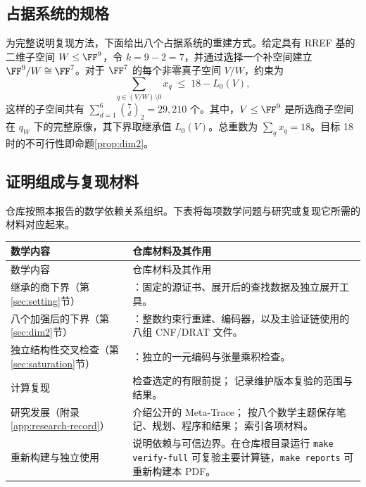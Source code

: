 \documentclass[11pt,a4paper]{article}
\begin{document}
\subsection{占据系统的规格}

为完整说明复现方法，下面给出八个占据系统的重建方式。给定具有 RREF 基的二维子空间 $W\le\FF^9$，令 $k=9-2=7$，并通过选择一个补空间建立 $\FF^9/W\cong\FF^7$。对于 $\FF^7$ 的每个非零真子空间 $V/W$，约束为
\[
  \sum_{q\in(V/W)\setminus0}x_q\;\le\;18-L_0(V),
\]
这样的子空间共有 $\sum_{d=1}^{6}\binom{7}{d}_2=29{,}210$ 个。其中，$V\le\FF^9$ 是所选商子空间在 $q_W$ 下的完整原像，其下界取继承值 $L_0(V)$。总重数为 $\sum_qx_q=18$。目标 18 时的不可行性即命题\ref{prop:dim2}。

\subsection{证明组成与复现材料}\label{app:repository}

仓库按照本报告的数学依赖关系组织。下表将每项数学问题与研究或复现它所需的材料对应起来。

\begin{longtable}{@{}L{4.8cm}L{9.8cm}@{}}
\toprule
数学内容&仓库材料及其作用\\
\midrule
\endfirsthead
\toprule 数学内容&仓库材料及其作用\\\midrule
\endhead
\bottomrule\endfoot
继承的商下界（第\ref{sec:setting}节）
&：固定的源证书、展开后的查找数据及独立展开工具。\\
八个加强后的下界（第\ref{sec:dim2}节）
&：整数约束行重建、编码器，以及主验证链使用的八组 CNF/DRAT 文件。\\
独立结构性交叉检查（第\ref{sec:saturation}节）
&：独立的一元编码与张量乘积检查。\\
计算复现
& 检查选定的有限前提； 记录维护版本复验的范围与结果。\\
研究发展（附录\ref{app:research-record}）
& 介绍公开的 Meta-Trace； 按八个数学主题保存笔记、规划、程序和结果； 索引各项材料。\\
重新构建与独立使用
& 说明依赖与可信边界。在仓库根目录运行 \texttt{make verify-full} 可复验主要计算链，\texttt{make reports} 可重新构建本 PDF。\\
\end{longtable}
\end{document}
